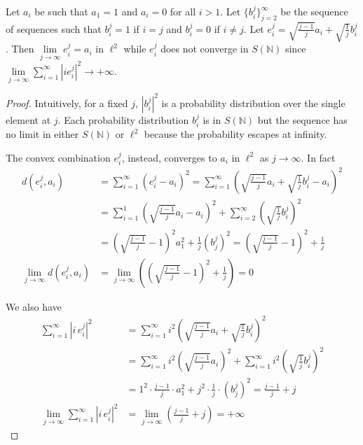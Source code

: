 \documentclass{techbrief}
\begin{document}
\begin{prop}
	Let $a_i$ be such that $a_1 = 1$ and $a_i = 0$ for all $i > 1$. Let  $\{b^j_i\}_{j=2}^{\infty}$ be the sequence of sequences such that $b^j_i = 1$ if $i=j$ and $b^j_i = 0$ if $i \neq j$. Let $e^j_i = \sqrt{\frac{j-1}{j}} a_i + \sqrt{\frac{1}{j}} b^j_i$. Then $\lim\limits_{j \to \infty}e^j_i = a_i$ in $\ell^2$ while $e^j_i$ does not converge in $S(\mathbb{N})$ since $\lim\limits_{j \to \infty} \sum_{i=1}^{\infty} |i e^j_i |^2 \to +\infty$.
\end{prop}

\begin{proof}
	Intuitively, for a fixed $j$, $|b^j_i|^2$ is a probability distribution over the single element at $j$. Each probability distribution $b^j_i$ is in $S(\mathbb{N})$ but the sequence has no limit in either $S(\mathbb{N})$ or $\ell^2$ because the probability escapes at infinity.
	
	The convex combination $e^j_i$, instead, converges to $a_i$ in $\ell^2$ as $j \to \infty$. In fact
	\begin{equation}
	\begin{aligned}
		d(e^j_i, a_i) &= \sum_{i=1}^{\infty} (e^j_i - a_i)^2 = \sum_{i=1}^{\infty} \left(\sqrt{\frac{j-1}{j}} a_i + \sqrt{\frac{1}{j}} b^j_i - a_i\right)^2 \\
		&= \sum_{i=1}^{1} \left(\sqrt{\frac{j-1}{j}} a_i- a_i\right)^2 + \sum_{i=2}^{\infty} \left(\sqrt{\frac{1}{j}} b^j_i \right)^2 \\
		&= \left(\sqrt{\frac{j-1}{j}} - 1\right)^2 a_1^2 + \frac{1}{j} (b^j_j)^2 = \left(\sqrt{\frac{j-1}{j}} - 1\right)^2 + \frac{1}{j} \\
		\lim_{j \to \infty} d(e^j_i, a_i) &= \lim_{j \to \infty} \left(\left(\sqrt{\frac{j-1}{j}} - 1\right)^2 + \frac{1}{j}\right) = 0
	\end{aligned}
	\end{equation}

	We also have
	\begin{equation}
	\begin{aligned}
		\sum_{i=1}^{\infty} |i \, e^j_i|^2 &= \sum_{i=1}^{\infty} i^2 \left(\sqrt{\frac{j-1}{j}} a_i + \sqrt{\frac{1}{j}} b^j_i\right)^2 \\
		&= \sum_{i=1}^{\infty} i^2 \left(\sqrt{\frac{j-1}{j}} a_i \right)^2 + \sum_{i=1}^{\infty} i^2 \left(\sqrt{\frac{1}{j}} b^j_i\right)^2 \\
		&= 1^2 \cdot \frac{j-1}{j} \cdot a_1^2 + j^2 \cdot \frac{1}{j} \cdot (b^j_j)^2 = \frac{j-1}{j} + j \\
		\lim_{j \to \infty} \sum_{i=1}^{\infty} |i \, e^j_i|^2 &= \lim_{j \to \infty} \left(\frac{j-1}{j} + j\right) = +\infty
	\end{aligned}
	\end{equation}
\end{proof}
\end{document}
